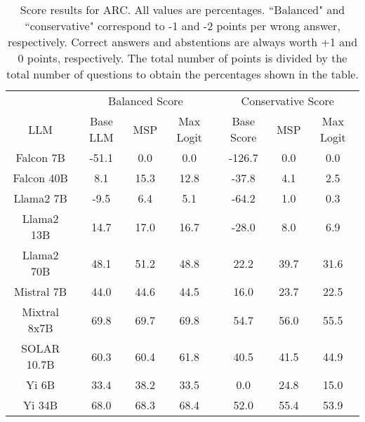 \renewcommand\arraystretch{1.2}
\begin{table*}
\centering
\begin{tabular}{c|c|c|c|c|c|c}
& \multicolumn{3}{c|}{Balanced Score} & \multicolumn{3}{c}{Conservative Score} \\ 
LLM & Base LLM & MSP & Max Logit & Base Score & MSP & Max Logit\\ \hline
Falcon 7B & -51.1 & 0.0 & 0.0 & -126.7 & 0.0 & 0.0\\
Falcon 40B & 8.1 & 15.3 & 12.8 & -37.8 & 4.1 & 2.5\\
Llama2 7B & -9.5 & 6.4 & 5.1 & -64.2 & 1.0 & 0.3\\
Llama2 13B & 14.7 & 17.0 & 16.7 & -28.0 & 8.0 & 6.9\\
Llama2 70B & 48.1 & 51.2 & 48.8 & 22.2 & 39.7 & 31.6\\
Mistral 7B & 44.0 & 44.6 & 44.5 & 16.0 & 23.7 & 22.5\\
Mixtral 8x7B & 69.8 & 69.7 & 69.8 & 54.7 & 56.0 & 55.5\\
SOLAR 10.7B & 60.3 & 60.4 & 61.8 & 40.5 & 41.5 & 44.9\\
Yi 6B & 33.4 & 38.2 & 33.5 & 0.0 & 24.8 & 15.0\\
Yi 34B & 68.0 & 68.3 & 68.4 & 52.0 & 55.4 & 53.9\\
\hline
\end{tabular}
\caption{Score results for ARC. All values are percentages. ``Balanced" and ``conservative" correspond to -1 and -2 points per wrong answer, respectively. Correct answers and abstentions are always worth +1 and 0 points, respectively. The total number of points is divided by the total number of questions to obtain the percentages shown in the table.}
\label{tab:arc_score}
\end{table*}
